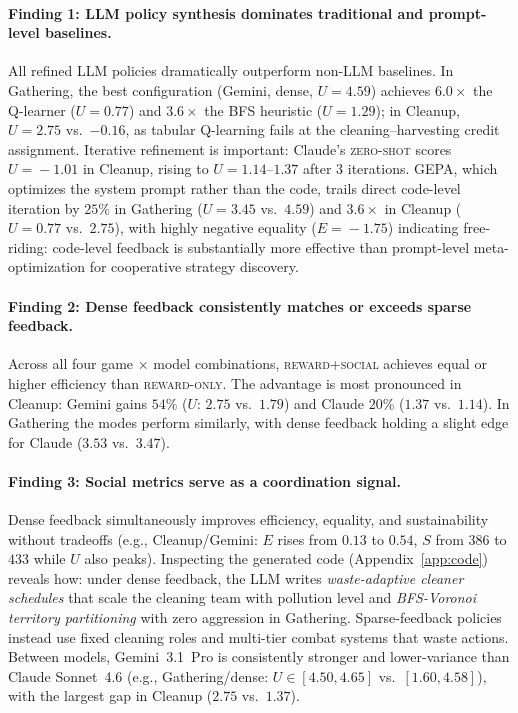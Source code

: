 \documentclass{nextgame2026} %
\begin{document}
\paragraph{Finding 1: LLM policy synthesis dominates traditional and
prompt-level baselines.}
All refined LLM policies dramatically outperform non-LLM baselines.  In
Gathering, the best configuration (Gemini, dense, $U\!=\!4.59$) achieves
$6.0\times$ the Q-learner ($U\!=\!0.77$) and $3.6\times$ the BFS heuristic
($U\!=\!1.29$); in Cleanup, $U\!=\!2.75$ vs.\ $-0.16$, as tabular Q-learning
fails at the cleaning--harvesting credit assignment.  Iterative refinement
is important: Claude's \textsc{zero-shot} scores $U\!=\!{-}1.01$ in Cleanup,
rising to $U\!=\!1.14$--$1.37$ after 3 iterations.  GEPA, which optimizes
the system prompt rather than the code, trails direct code-level iteration
by $25\%$ in Gathering ($U\!=\!3.45$ vs.\ $4.59$) and $3.6\times$ in
Cleanup ($U\!=\!0.77$ vs.\ $2.75$), with highly negative equality
($E\!=\!{-}1.75$) indicating free-riding: code-level feedback is
substantially more effective than prompt-level meta-optimization for
cooperative strategy discovery.

\paragraph{Finding 2: Dense feedback consistently matches or exceeds
sparse feedback.}
Across all four game$\,\times\,$model combinations,
\textsc{reward+social} achieves equal or higher efficiency than
\textsc{reward-only}.  The advantage is most pronounced in Cleanup:
Gemini gains $54\%$ ($U$: $2.75$ vs.\ $1.79$) and Claude $20\%$
($1.37$ vs.\ $1.14$).  In Gathering the modes perform similarly,
with dense feedback holding a slight edge for Claude
($3.53$ vs.\ $3.47$).

\paragraph{Finding 3: Social metrics serve as a coordination signal.}
Dense feedback simultaneously improves efficiency, equality, and
sustainability without tradeoffs (e.g., Cleanup/Gemini: $E$ rises from
$0.13$ to $0.54$, $S$ from $386$ to $433$ while $U$ also peaks).
Inspecting the generated code (Appendix~\ref{app:code}) reveals how:
under dense feedback, the LLM writes \emph{waste-adaptive cleaner
schedules} that scale the cleaning team with pollution level and
\emph{BFS-Voronoi territory partitioning} with zero aggression in
Gathering.  Sparse-feedback policies instead use fixed cleaning roles
and multi-tier combat systems that waste actions.
Between models, Gemini~3.1~Pro is consistently stronger and lower-variance
than Claude Sonnet~4.6 (e.g., Gathering/dense: $U\!\in\![4.50,4.65]$ vs.\
$[1.60,4.58]$), with the largest gap in Cleanup ($2.75$ vs.\ $1.37$).
\end{document}
